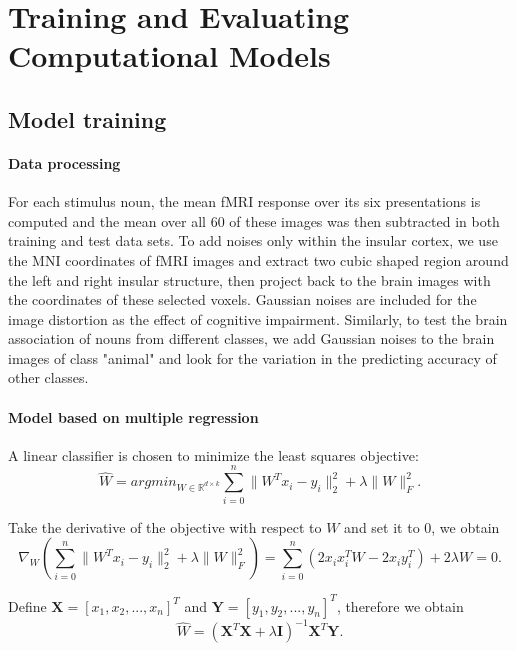 \documentclass{article}
\begin{document}
\section{Training and Evaluating Computational Models}
\subsection{Model training}
\paragraph{Data processing} For each stimulus noun, the mean fMRI response over its six presentations is computed and the mean over all 60 of these images was then subtracted in both training and test data sets. To add noises only within the insular cortex, we use the MNI coordinates of fMRI images and extract two cubic shaped region around the left and right insular structure, then project back to the brain images with the coordinates of these selected voxels. Gaussian noises are included for the image distortion as the effect of cognitive impairment. Similarly, to test the brain association of nouns from different classes, we add Gaussian noises to the brain images of class "animal" and look for the variation in the predicting accuracy of other classes. 

\paragraph{Model based on multiple regression}
A linear classifier is chosen to minimize the least squares objective:
\begin{equation}
\hat{W}=argmin_{W\in\mathbb{R}^{d\times k}}\sum_{i=0}^{n}\|W^{T}x_{i}-y_{i}\|^{2}_{2}+\lambda\|W\|^{2}_{F}.
\end{equation}

Take the derivative of the objective with respect to $W$ and set it to 0, we obtain 
\begin{equation}
\nabla_{W}(\sum_{i=0}^{n}\|W^{T}x_{i}-y_{i}\|^{2}_{2}+\lambda\|W\|^{2}_{F})=\sum_{i=0}^{n}(2x_{i}x_{i}^{T}W-2x_{i}y_{i}^{T})+2\lambda W=0.
\end{equation}

Define $\mathbf{X}=[x_{1}, x_{2},...,x_{n}]^{T}$ and $\mathbf{Y}=[y_{1},y_{2},...,y_{n}]^{T}$, therefore we obtain
\begin{equation}
\hat{W}=(\mathbf{X}^{T}\mathbf{X}+\lambda\mathbf{I})^{-1}\mathbf{X}^{T}\mathbf{Y}.
\end{equation}
\end{document}
